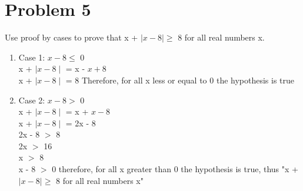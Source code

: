 \documentclass[12pt,letterpaper]{article}
\begin{document}
\section*{Problem 5}
Use proof by cases to prove that x + \(\mid x - 8\mid \geq\) 8 for all real numbers x. 
\begin{enumerate}
  \item Case 1: \( x - 8\leq\) 0 \\
  x + \(\mid x - 8\mid \) = x  - \( x + 8\)\\
  x + \(\mid x - 8\mid \) = 8 Therefore, for all x less or equal to 0 the hypothesis is true
  \item Case 2: \( x - 8>\) 0 \\
  x + \(\mid x - 8\mid \) = x  + \( x - 8\)\\
  x + \(\mid x - 8\mid \) = 2x - 8 \\
  2x - 8 \(>\) 8\\
  2x \(>\) 16 \\
  x \(>\) 8 \\
  x - 8 \(>\) 0  therefore, for all x greater than 0 the hypothesis is true, thus "x + \(\mid x - 8\mid \geq\) 8 for all real numbers x"\\
\end{enumerate}

\end{document}
